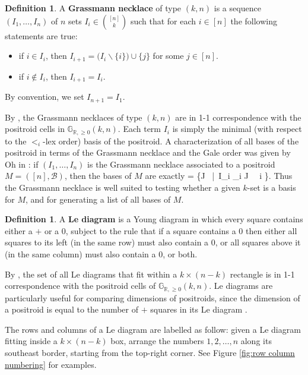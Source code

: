 \documentclass[11pt]{article}
\newcommand{\R}{\mathbb{R}}
\newcommand{\Gr}{\mathbb{G}_{\R, \geq 0}}
\def\ba #1\ea{\begin{align} #1 \end{align}}
\newcommand{\cB}{\mathcal{B}}
\newcommand{\gale}[1]{\preccurlyeq_{#1}}
\theoremstyle{remark}
\theoremstyle{definition}
\newtheorem{dfn}[thm]{Definition}
\begin{document}
\begin{dfn}\label{def:grassmann necklace}
A {\bf Grassmann necklace} of type $(k,n)$ is a sequence $(I_1, \dots, I_n)$ of $n$ sets $I_i \in \binom{[n]}{k}$ such that for each $i \in [n]$ the following statements are true:
\begin{itemize}
\item if $i \in I_i$, then $I_{i+1} = \big(I_i \backslash \{i\}\big) \cup \{j\}$ for some $j \in[n]$.
\item if $i \not\in I_i$, then $I_{i+1} = I_i$.
\end{itemize}
By convention, we set $I_{n+1} = I_1$.
\end{dfn}

By \cite[Theorem 17.1]{Postnikov}, the Grassmann necklaces of type $(k,n)$ are in 1-1 correspondence with the positroid cells in $\Gr(k,n)$. Each term $I_i$ is simply the minimal (with respect to the $<_i$-lex order) basis of the positroid. A characterization of all bases of the positroid in terms of the Grassmann necklace and the Gale order was given by Oh in \cite[Theorem 8]{Oh}: if $(I_1, \dots, I_n)$ is the Grassmann necklace associated to a positroid $M = ([n],\cB)$, then the bases of $M$ are exactly
\ba \cB = \left\{J \in {}\ \Big|\ I_i \gale{i} J \ \ \forall i \in [n]\right\}. \label{basesofmatroids}\ea
Thus the Grassmann necklace is well suited to testing whether a given $k$-set is a basis for $M$, and for generating a list of all bases of $M$.


\begin{dfn}\label{def:le diagram}
A {\bf Le diagram} is a Young diagram in which every square contains either a $+$ or a $0$, subject to the rule that if a square contains a $0$ then either all squares to its left (in the same row) must also contain a $0$, or all squares above it (in the same column) must also contain a $0$, or both.
\end{dfn}

By \cite[Theorem 6.5]{Postnikov}, the set of all Le diagrams that fit within a $k\times(n-k)$ rectangle is in 1-1 correspondence with the positroid cells of $\Gr(k,n)$. Le diagrams are particularly useful for comparing dimensions of positroids, since the dimension of a positroid is equal to the number of $+$ squares in its Le diagram \cite[Theorem 6.5]{Postnikov}.

The rows and columns of a Le diagram are labelled as follow: given a Le diagram fitting inside a $k\times (n-k)$ box, arrange the numbers $1,2, \dots, n$ along its southeast border, starting from the top-right corner. See Figure \ref{fig:row column numbering} for examples.
\end{document}
